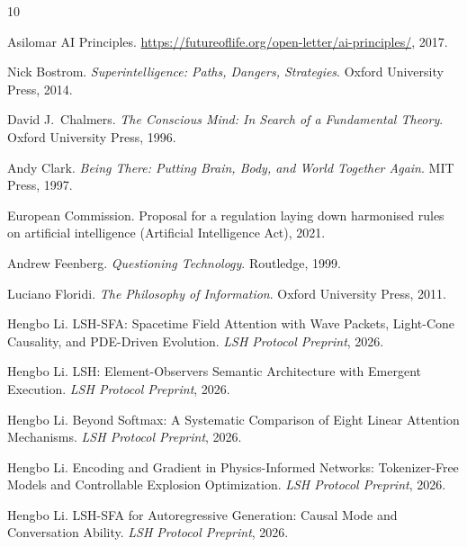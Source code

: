 \documentclass{article}
\begin{document}
\begin{thebibliography}{10}

Asilomar AI Principles.
\newblock \url{https://futureoflife.org/open-letter/ai-principles/}, 2017.

Nick Bostrom.
\newblock \textit{Superintelligence: Paths, Dangers, Strategies}.
\newblock Oxford University Press, 2014.

David J.~Chalmers.
\newblock \textit{The Conscious Mind: In Search of a Fundamental Theory}.
\newblock Oxford University Press, 1996.

Andy Clark.
\newblock \textit{Being There: Putting Brain, Body, and World Together Again}.
\newblock MIT Press, 1997.

European Commission.
\newblock Proposal for a regulation laying down harmonised rules on artificial intelligence (Artificial Intelligence Act), 2021.

Andrew Feenberg.
\newblock \textit{Questioning Technology}.
\newblock Routledge, 1999.

Luciano Floridi.
\newblock \textit{The Philosophy of Information}.
\newblock Oxford University Press, 2011.

Hengbo Li.
\newblock LSH-SFA: Spacetime Field Attention with Wave Packets, Light-Cone Causality, and PDE-Driven Evolution.
\newblock \emph{LSH Protocol Preprint}, 2026.

Hengbo Li.
\newblock LSH: Element-Observers Semantic Architecture with Emergent Execution.
\newblock \emph{LSH Protocol Preprint}, 2026.

Hengbo Li.
\newblock Beyond Softmax: A Systematic Comparison of Eight Linear Attention Mechanisms.
\newblock \emph{LSH Protocol Preprint}, 2026.

Hengbo Li.
\newblock Encoding and Gradient in Physics-Informed Networks: Tokenizer-Free Models and Controllable Explosion Optimization.
\newblock \emph{LSH Protocol Preprint}, 2026.

Hengbo Li.
\newblock LSH-SFA for Autoregressive Generation: Causal Mode and Conversation Ability.
\newblock \emph{LSH Protocol Preprint}, 2026.


\end{thebibliography}
\end{document}
